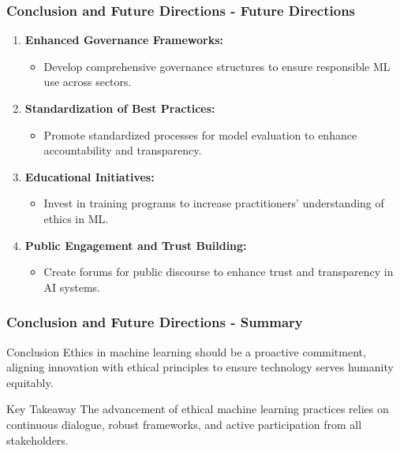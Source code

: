 \documentclass[aspectratio=169]{beamer}
\begin{document}
\begin{frame}[fragile]
    \frametitle{Conclusion and Future Directions - Future Directions}
    \begin{enumerate}
        \item \textbf{Enhanced Governance Frameworks:} 
        \begin{itemize}
            \item Develop comprehensive governance structures to ensure responsible ML use across sectors.
        \end{itemize}

        \item \textbf{Standardization of Best Practices:}
        \begin{itemize}
            \item Promote standardized processes for model evaluation to enhance accountability and transparency.
        \end{itemize}

        \item \textbf{Educational Initiatives:}
        \begin{itemize}
            \item Invest in training programs to increase practitioners' understanding of ethics in ML.
        \end{itemize}

        \item \textbf{Public Engagement and Trust Building:}
        \begin{itemize}
            \item Create forums for public discourse to enhance trust and transparency in AI systems.
        \end{itemize}
    \end{enumerate}
\end{frame}

\begin{frame}[fragile]
    \frametitle{Conclusion and Future Directions - Summary}
    \begin{block}{Conclusion}
        Ethics in machine learning should be a proactive commitment, aligning innovation with ethical principles to ensure technology serves humanity equitably.
    \end{block}
    
    \vspace{0.5cm}

    \begin{block}{Key Takeaway}
        The advancement of ethical machine learning practices relies on continuous dialogue, robust frameworks, and active participation from all stakeholders.
    \end{block}
\end{frame}
\end{document}
